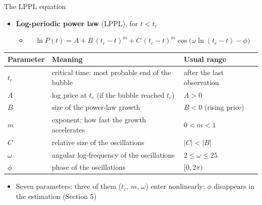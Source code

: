 \begin{frame}{The LPPL equation}
\itemsize{\footnotesize}
\begin{itemize}
    \item \textbf{Log-periodic power law} (LPPL), for $t < t_c$
    \begin{itemize}
        \item $\quad \ln P(t) = A + B\,(t_c - t)^m + C\,(t_c - t)^m \cos\bigl(\omega \ln(t_c - t) - \phi\bigr)$
    \end{itemize}
\end{itemize}\begin{center}
\scriptsize
\begin{tabular}{lll}
\toprule
\textbf{Parameter} & \textbf{Meaning} & \textbf{Usual range} \\
\midrule
$t_c$ & critical time: most probable end of the bubble & after the last observation \\
$A$ & log price at $t_c$ (if the bubble reached $t_c$) & $A > 0$ \\
$B$ & size of the power-law growth & $B < 0$ (rising price) \\
$m$ & exponent: how fast the growth accelerates & $0 < m < 1$ \\
$C$ & relative size of the oscillations & $|C| < |B|$ \\
$\omega$ & angular log-frequency of the oscillations & $2 \le \omega \le 25$ \\
$\phi$ & phase of the oscillations & $[0, 2\pi)$ \\
\bottomrule
\end{tabular}
\end{center}
\begin{itemize}
    \item Seven parameters: three of them ($t_c$, $m$, $\omega$) enter nonlinearly; $\phi$ disappears in the estimation (Section 5)
\end{itemize}
\end{frame}

